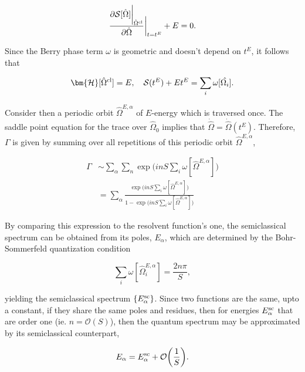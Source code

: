 \begin{equation}
    \frac{\partial\mathcal{S}[\hat{\Omega}]\bigg|_{\hat{\Omega}^{\textnormal{cl}}}}{\partial  \hat{\Omega}}\bigg|_{t = t^E} + E = 0. 
\end{equation}

Since the Berry phase term $\omega$ is geometric and doesn't depend on $t^E$, it follows that 

\begin{equation}
    \bm{\mathcal{H}}[\hat{\Omega}^{\textnormal{cl}}] = E, \quad \mathcal{S}(t^E) + Et^E = \sum_{i} \omega[\hat{\Omega_i}].
\end{equation}

Consider then a periodic orbit $\hat{\Omega}^{E, \alpha}$ of $E$-energy which is traversed once. The saddle point equation for the trace over $\hat{\Omega}_0$ implies that 
$\dot{\hat{\Omega}} = \dot{\hat{\Omega}}(t^E)$. Therefore, $\Gamma$ is given by summing over all repetitions of this periodic orbit $\hat{\Omega}^{E, \alpha}$,

\begin{equation}
    \begin{split}
        \Gamma &\sim \sum_{\alpha} \sum_{n} \exp \bigg(in S \sum_{i} \omega[\hat{\Omega}^{E, \alpha}]\bigg) \\
        &= \sum_{\alpha} \frac{\exp \bigg(in S \sum_{i} \omega[\hat{\Omega}^{E, \alpha}]\bigg)}{1-\exp \bigg(in S \sum_{i} \omega[\hat{\Omega}^{E, \alpha}]\bigg)}
    \end{split}
\end{equation}

By comparing this expression to the resolvent function's one, the semiclassical spectrum can be obtained from its poles, $E_{\alpha}$, which are determined by the Bohr-Sommerfeld quantization condition 

\begin{equation}
    \sum_{i} \omega[\hat{\Omega}_i^{E, \alpha}] = \frac{2n\pi}{S},
\end{equation}

yielding the semiclassical spectrum $\{E_{\alpha}^{\textnormal{sc}}\}$. Since two functions are the same, upto a constant, if they share the same poles and residues, then for energies $E_{\alpha}^{\textnormal{sc}}$ that are order one (ie. $n = \mathcal{O}(S)$), then the quantum spectrum may be approximated by its semiclassical counterpart,

\begin{equation}
    E_{\alpha} = E_{\alpha}^{\textnormal{sc}} + \mathcal{O}\bigg(\frac{1}{S}\bigg).
\end{equation}

